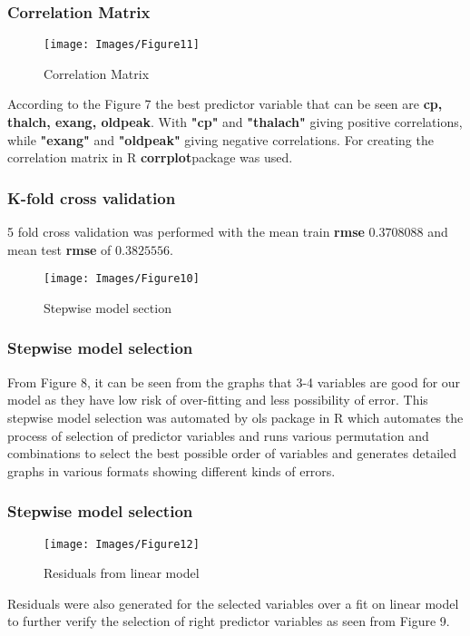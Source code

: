 \documentclass[11pt]{article}
\begin{document}
\begin{multicols}{2}
    \subsubsection{Correlation Matrix }
    \begin{figure}[H]
        \centering
        \texttt{[image: Images/Figure11]}
        \vspace{-15pt}
        \caption{Correlation Matrix}
    \end{figure}
    According to the Figure 7 the best predictor variable that can be seen are \textbf{cp, thalch, exang, oldpeak}. With \textbf{"cp"} and \textbf{"thalach"} giving positive correlations, while \textbf{"exang"} and \textbf{"oldpeak"} giving negative correlations. For creating the correlation matrix in R \textbf{corrplot}package was used. 
    
    \subsubsection{K-fold cross validation }
    5 fold cross validation was performed with the mean train \textbf{rmse} $0.3708088$ and mean test \textbf{rmse} of $0.3825556$.
    \vspace{-15pt}
    \begin{figure}[H]
        \centering
        \texttt{[image: Images/Figure10]}
        \vspace{-15pt}
        \caption{Stepwise model section}
    \end{figure} 

    \subsubsection{Stepwise model selection}
    From Figure 8, it can be seen from the graphs that 3-4 variables are good for our model as they have low risk of over-fitting and less possibility of error. This stepwise model selection was automated by ols \cite{ols} package in R which automates the process of selection of predictor variables and runs various permutation and combinations to select the best possible order of variables and generates detailed graphs in various formats showing different kinds of errors. 

    \subsubsection{Stepwise model selection}
    \begin{figure}[H]
        \centering
        \texttt{[image: Images/Figure12]}
        \vspace{-15pt}
        \caption{Residuals from linear model}
    \end{figure} 
    Residuals were also generated for the selected variables over a fit on linear model to further verify the selection of right predictor variables as seen from Figure 9. \newline \newline 


\end{multicols}
\end{document}
